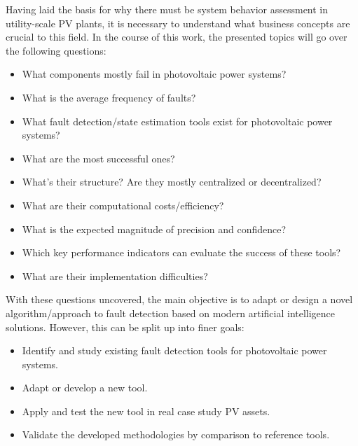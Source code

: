 Having laid the basis for why there must be system behavior assessment in
utility-scale PV plants, it is necessary to understand what business concepts
are crucial to this field. In the course of this work, the presented topics will
go over the following questions:

\begin{itemize}
    \item What components mostly fail in photovoltaic power systems?
    \item What is the average frequency of faults?
    \item What fault detection/state estimation tools exist for photovoltaic
    power systems?
    \item What are the most successful ones?
    \item What's their structure? Are they mostly centralized or decentralized?
    \item What are their computational costs/efficiency?
    \item What is the expected magnitude of precision and confidence?
    \item Which key performance indicators can evaluate the success of these
    tools? 
    \item What are their implementation difficulties?
\end{itemize}

With these questions uncovered, the main objective is to adapt or design a novel
algorithm/approach to fault detection based on modern artificial intelligence
solutions. However, this can be split up into finer goals:

\begin{itemize}
    \item  Identify and study existing fault detection tools for photovoltaic
    power systems.
    \item  Adapt or develop a new tool.
    \item Apply and test the new tool in real case study PV assets.
    \item Validate the developed methodologies by comparison to reference tools.
\end{itemize}

